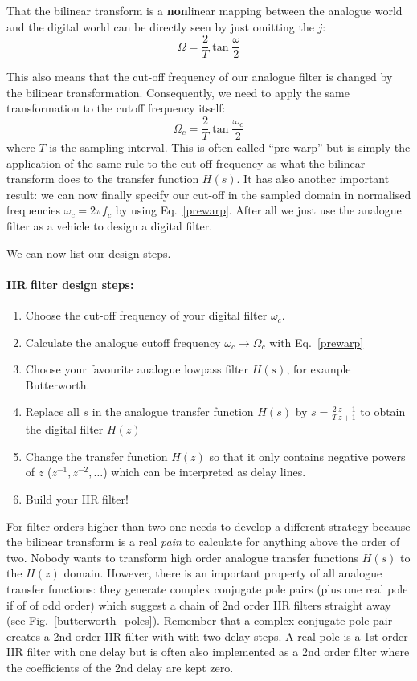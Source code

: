 \documentclass[12pt,a4paper]{article}
\begin{document}
That the bilinear transform is a 
{\bf non}linear mapping between the analogue world and the digital
world can be directly seen by just omitting the $j$:
\begin{equation}
\Omega = \frac{2}{T} \tan \frac{\omega}{2}
\end{equation}

This also means that the cut-off frequency of our analogue filter is changed
by the bilinear transformation. Consequently, we need to apply the same
transformation to the cutoff frequency itself:
\begin{equation}
\Omega_{c} = \frac{2}{T} \tan \frac {\omega_{c}}{2}
\label{prewarp}
\end{equation}
where $T$ is the sampling interval. This is often called ``pre-warp''
but is simply the application of the same rule to the cut-off
frequency as what the bilinear transform does to the transfer function
$H(s)$. It has also another important result: we can now finally
specify our cut-off in the sampled domain in normalised frequencies
$\omega_{c} = 2\pi f_{c}$ by using Eq.~\ref{prewarp}. After all we
just use the analogue filter as a vehicle to design a digital filter.

We can now list our design steps.

\paragraph{IIR filter design steps:}
\begin{enumerate}
\item Choose the cut-off frequency of your digital filter $\omega_{c}$.
\item Calculate the analogue cutoff frequency $\omega_{c} \rightarrow
  \Omega_{c}$ with Eq.~\ref{prewarp}
\item Choose your favourite analogue lowpass filter $H(s)$,
for example Butterworth.
\item Replace all $s$ in the analogue transfer function
$H(s)$ by $s = \frac{2}{T} \frac{z - 1}{z + 1}$ 
to obtain the digital filter $H(z)$
\item Change the transfer function $H(z)$ so that it only contains
negative powers of $z$ ($z^{-1}, z^{-2}, \ldots$) which can be
interpreted as delay lines.
\item Build your IIR filter!
\end{enumerate}

For filter-orders higher than two one needs to develop a different
strategy because the bilinear transform is a real \textsl{pain} to
calculate for anything above the order of two. Nobody wants to
transform high order analogue transfer functions $H(s)$ to the $H(z)$
domain. However, there is an important property of all analogue
transfer functions: they generate complex conjugate pole pairs (plus
one real pole if of of odd order) which suggest a chain of 2nd order IIR
filters straight away (see Fig.~\ref{butterworth_poles}). Remember
that a complex conjugate pole pair creates a 2nd order IIR filter with
with two delay steps. A real pole is a 1st order IIR filter with one
delay but is often also implemented as a 2nd order filter where the
coefficients of the 2nd delay are kept zero.
\end{document}
